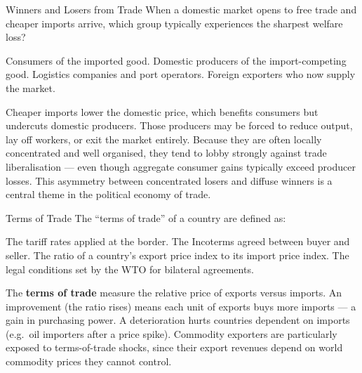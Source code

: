 \documentclass[paper=a5]{scrartcl}
\begin{document}
\begin{question}[type=mc]{Winners and Losers from Trade}
When a domestic market opens to free trade and cheaper imports arrive,
which group typically experiences the sharpest welfare loss?
\begin{choices}
  \choice        Consumers of the imported good.
  \correctchoice Domestic producers of the import-competing good.
  \choice        Logistics companies and port operators.
  \choice        Foreign exporters who now supply the market.
\end{choices}
\begin{solution}
  Cheaper imports lower the domestic price, which benefits consumers but
  undercuts domestic producers. Those producers may be forced to reduce
  output, lay off workers, or exit the market entirely. Because they are
  often locally concentrated and well organised, they tend to lobby strongly
  against trade liberalisation --- even though aggregate consumer gains
  typically exceed producer losses. This asymmetry between concentrated
  losers and diffuse winners is a central theme in the political economy
  of trade.
\end{solution}
\end{question}

\begin{question}[type=mc]{Terms of Trade}
The ``terms of trade'' of a country are defined as:
\begin{choices}
  \choice        The tariff rates applied at the border.
  \choice        The Incoterms agreed between buyer and seller.
  \correctchoice The ratio of a country's export price index to its import
                 price index.
  \choice        The legal conditions set by the WTO for bilateral agreements.
\end{choices}
\begin{solution}
  The \textbf{terms of trade} measure the relative price of exports versus
  imports. An improvement (the ratio rises) means each unit of exports buys
  more imports --- a gain in purchasing power. A deterioration hurts countries
  dependent on imports (e.g.\ oil importers after a price spike). Commodity
  exporters are particularly exposed to terms-of-trade shocks, since their
  export revenues depend on world commodity prices they cannot control.
\end{solution}
\end{question}
\end{document}
